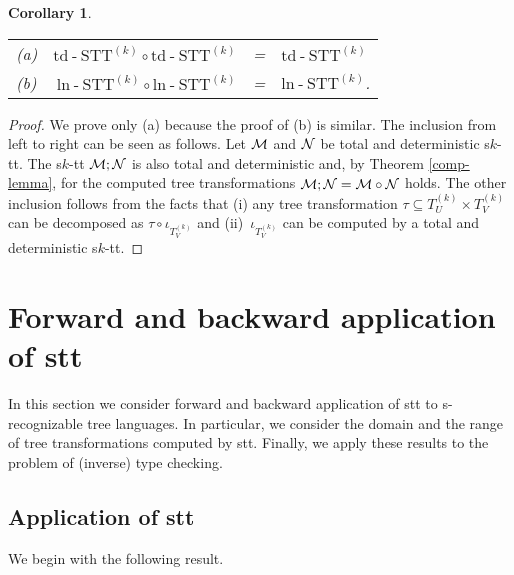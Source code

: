 \documentclass[10pt]{scrartcl}
\newtheorem{cor}[df]{Corollary}
\newcommand{\tdSTT}{\mathrm{td}\n\mathrm{STT}}
\newcommand{\lnSTT}{\mathrm{ln}\n\mathrm{STT}}
\newcommand{\M}{{\cal M}}
\newcommand{\N}{{\cal N}}
\DeclareMathOperator{\n}{-}
\def\ui#1{^{(#1)}}
\begin{document}
\begin{cor} \rm
\begin{tabular}[t]{lrcl}
(a) & $\tdSTT\ui k\circ \tdSTT\ui k$ & = & $\tdSTT\ui k$ \\
(b) & $\lnSTT\ui k\circ \lnSTT\ui k$ & = & $\lnSTT\ui k$. 
\end{tabular}
\end{cor}
\begin{proof} We prove only (a) because the proof of (b) is similar. The inclusion from left to right can be seen as follows.
Let $\M$ and $\N$ be total and deterministic s$k$-tt. The s$k$-tt $\M;\N$ is also 
total and deterministic and, by Theorem \ref{comp-lemma}, for the computed tree transformations
$\M;\N=\M\circ \N$ holds. The other inclusion follows from the facts
that (i) any tree transformation $\tau \subseteq T_U \ui k\times T_V
\ui k$ can be decomposed as $\tau \circ \iota_{T_V \ui k}$ and (ii)~$\iota_{T_V \ui k}$ can be computed by a total and deterministic s$k$-tt.
\end{proof}

\section{Forward and backward application of stt}

In this section we consider forward and backward application of stt to s-recognizable tree languages.
In particular, we consider the domain and the range of tree transformations computed by stt. 
Finally, we apply these results to the problem of (inverse) type checking. 

\subsection{Application of stt}

We begin with the following result.
\end{document}
